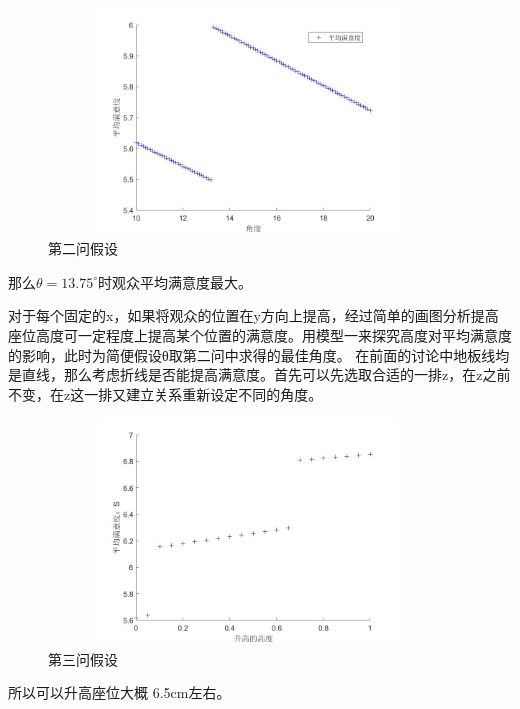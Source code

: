 \documentclass[a4paper,20pt]{article}
\begin{document}
\begin{itemize}
          \begin{figure}[h]
              \centering
              \includegraphics[width=300pt,height=170pt]{Homework7_2.jpg}
              \caption{第二问假设}
          \end{figure}
          \par \noindent 那么$\theta=13.75^\circ$时观众平均满意度最大。
          \par \noindent 对于每个固定的x，如果将观众的位置在y方向上提高，经过简单的画图分析提高座位高度可一定程度上提高某个位置的满意度。用模型一来探究高度对平均满意度的影响，此时为简便假设θ取第二问中求得的最佳角度。
          在前面的讨论中地板线均是直线，那么考虑折线是否能提高满意度。首先可以先选取合适的一排z，在z之前不变，在z这一排又建立关系重新设定不同的角度。
          \begin{figure}[h]
              \centering
              \includegraphics[width=300pt,height=170pt]{Homework7_3.jpg}
              \caption{第三问假设}
          \end{figure}
          \par \noindent 所以可以升高座位大概 6.5cm左右。
\end{itemize}
\end{document}

